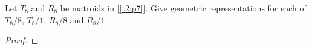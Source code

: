 \prob
{
    Let $T_8$ and $R_8$ be matroids in [\ref{t2:p7}]. Give geometric
		representations for each of $T_8 / 8$, $T_8 / 1$, $R_8 / 8$ and $R_8 / 1$.
}
\begin{proof}
\end{proof}